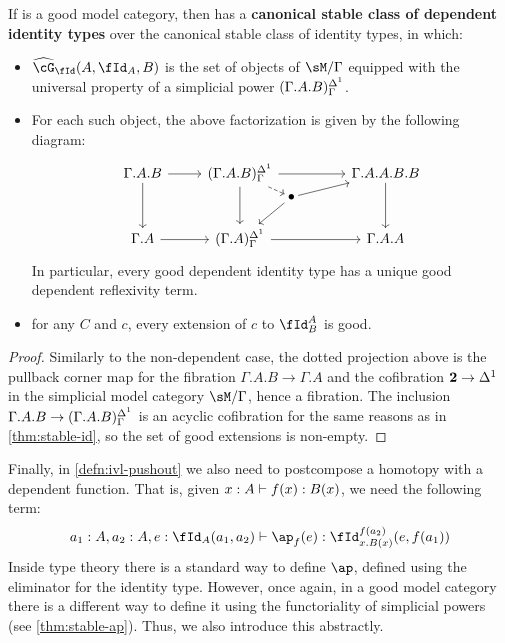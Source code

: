 \documentclass{amsart}
\let\Id\fId
\let\G\cG
\def\dG{\widehat{\G}}
\renewcommand{\idover}[4][]{\fId_{#1}^{#4}(#2,#3)}
\begin{document}
\begin{thm}\label{thm:stable-dep-id}
  If \sM is a good model category, then \fibm has a \textbf{canonical stable class of dependent identity types} over the canonical stable class of identity types, in which:
  \begin{itemize}
  \item $\dG_\Id(A,\Id_A,B)$ is the set of objects of $\sM/\Gamma$ equipped with the universal property of a simplicial power $(\Gamma.A.B)^{\Delta^1}_\Gamma$.
  \item For each such object, the above factorization is given by the following diagram:
    \[
    \begin{tikzcd}[row sep=large]
      \Gamma.A.B \ar[r] \ar[d] & (\Gamma.A.B)^\ivl_\Gamma \ar[rr] \ar[d] \ar[drr,phantom,near start,"\bullet"{name=hi}] \ar[dashed,to=hi] && \Gamma.A.A.B.B \ar[d] \ar[from=hi] \\
      \Gamma.A \ar[r] & (\Gamma.A)^\ivl_\Gamma \ar[rr] \ar[from=hi] && \Gamma.A.A
    \end{tikzcd}
    \]
    In particular, every good dependent identity type has a unique good dependent reflexivity term.
  \item for any $C$ and $c$, every extension of $c$ to $\Id^A_B$ is good.
  \end{itemize}
\end{thm}
\begin{proof}
  Similarly to the non-dependent case, the dotted projection above is the pullback corner map for the fibration $\Gamma.A.B\to\Gamma.A$ and the cofibration $\mathbf{2}\to {\Delta^1}$ in the simplicial model category $\sM/\Gamma$, hence a fibration.
  The inclusion $\Gamma.A.B \to (\Gamma.A.B)^{\Delta^1}_\Gamma$ is an acyclic cofibration for the same reasons as in \cref{thm:stable-id}, so the set of good extensions is non-empty.
\end{proof}

Finally, in \cref{defn:ivl-pushout} we also need to postcompose a homotopy with a dependent function.
That is, given $x:A \vdash f(x):B(x)$, we need the following term:
\[ a_1:A, a_2:A, e:\id[A]{a_1}{a_2} \types \ap_f(e) : \idover[x.B(x)]{e}{f(a_1)}{f(a_2)} \]
Inside type theory there is a standard way to define $\ap$, defined using the eliminator for the identity type.
However, once again, in a good model category there is a different way to define it using the functoriality of simplicial powers (see \cref{thm:stable-ap}).
Thus, we also introduce this abstractly.
\end{document}
